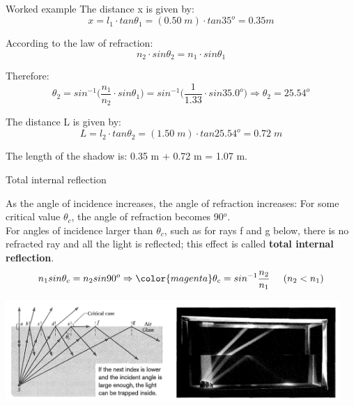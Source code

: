 {\begin{frame}{Worked example}
The distance x is given by:
\begin{equation*}
    x=l_1 \cdot tan\theta_1 = (0.50 \; m) \cdot tan35^{o} = 0.35 m
\end{equation*}

According to the law of refraction:
\begin{equation*}
   n_2 \cdot  sin\theta_2 = n_1 \cdot sin\theta_1
\end{equation*}

Therefore:
\begin{equation*}
  \theta_2 = sin^{-1} \Big( \frac{n_1}{n_2} \cdot sin\theta_1 \Big)
                = sin^{-1} \Big( \frac{1}{1.33} \cdot sin35.0^{o} \Big) \Rightarrow \theta_2 = 25.54^{o}
\end{equation*}

The distance L is given by:
\begin{equation*}
   L = l_2 \cdot tan\theta_2 = (1.50\; m) \cdot tan25.54^{o} = 0.72 \; m
\end{equation*}

The length of the shadow is: 0.35 m  + 0.72 m = 1.07 m.

\end{frame}

} %

%
%
%

\begin{frame}{Total internal reflection}

As the angle of incidence increases, the angle of refraction
increases: For some critical value $\theta_c$, the angle of refraction
becomes 90$^o$.\\
\vspace{0.1cm}
For angles of incidence larger than $\theta_c$, such as for rays f and
g below, there is no refracted ray and all the light is reflected;
this effect is called {\bf total internal reflection}.\\
\begin{equation*}
       n_1 sin\theta_c = n_2 sin90^o \Rightarrow
       {\color{magenta}\theta_c = sin^{-1} \frac{n_2}{n_1}}\;\;\;\;\;(n_2 < n_1)
\end{equation*}

\begin{center}
    \includegraphics[width=0.95\textwidth]{./images/schematics/total_internal_reflection}\\
\end{center}

\end{frame}

